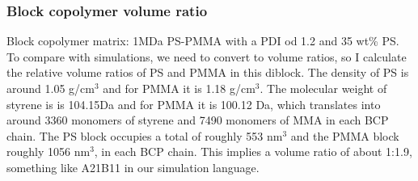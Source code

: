 \subsubsection{Block copolymer volume ratio}

Block copolymer matrix: 1MDa PS-PMMA with a PDI od 1.2 and 35 wt\% PS. To compare with simulations, we need to convert to volume ratios, so I calculate the relative volume ratios of PS and PMMA in this diblock. The density of PS is around 1.05 g/cm$^3$ and for PMMA it is 1.18 g/cm$^3$. The molecular weight of styrene is is 104.15Da and for PMMA it is 100.12 Da, which translates into around 3360 monomers of styrene and 7490 monomers of MMA in each BCP chain. The PS block occupies a total of roughly 553 nm$^3$ and the PMMA block roughly 1056 nm$^3$, in each BCP chain. This implies a volume ratio of about 1:1.9, something like A21B11 in our simulation language.
